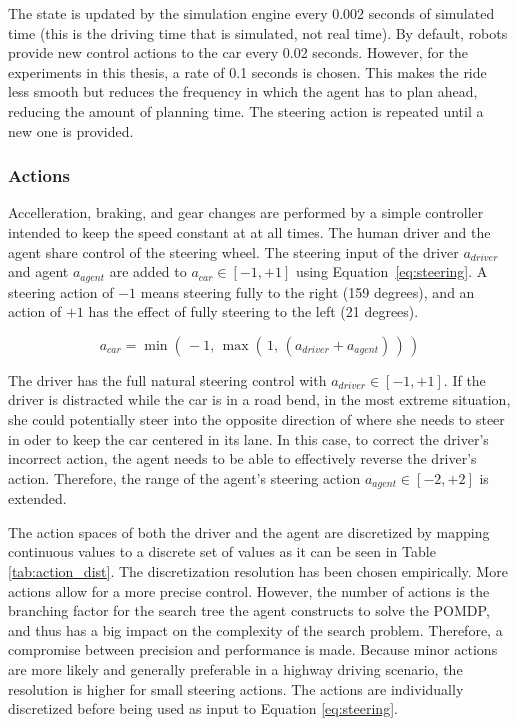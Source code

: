 The state is updated by the simulation engine every 0.002 seconds of simulated time (this is the driving time that is simulated, not real time). By default, robots provide new control actions to the car every 0.02 seconds. However, for the experiments in this thesis, a rate of 0.1 seconds is chosen. This makes the ride less smooth but reduces the frequency in which the agent has to plan ahead, reducing the amount of planning time. The steering action is repeated until a new one is provided.

\subsubsection{Actions}
\label{sec:actions}

Accelleration, braking, and gear changes are performed by a simple controller intended to keep the speed constant at at all times. The human driver and the agent share control of the steering wheel. The steering input of the driver $a_{driver}$ and agent $a_{agent}$ are added to $a_{car} \in [-1, +1]$ using Equation~\ref{eq:steering}. A steering action of $-1$ means steering fully to the right (159 degrees), and an action of $+1$ has the effect of fully steering to the left (21 degrees). 

\begin{equation}
    a_{car} = \min(\, -1, \, \max(\, 1, \, (a_{driver} + a_{agent})\,)\,)
    \label{eq:steering}
\end{equation}

The driver has the  full natural steering control with $a_{driver} \in [-1, +1]$. If the driver is distracted while the car is in a road bend, in the most extreme situation, she could potentially steer into the opposite direction of where she needs to steer in oder to keep the car centered in its lane. In this case, to correct the driver's incorrect action, the agent needs to be able to effectively reverse the driver's action. Therefore, the range of the agent's steering action $a_{agent} \in [-2, +2]$ is extended. 

The action spaces of both the driver and the agent are discretized by mapping continuous values to a discrete set of values as it can be seen in Table \ref{tab:action_dist}. The discretization resolution has been chosen empirically. More actions allow for a more precise control. However, the number of actions is the branching factor for the search tree the agent constructs to solve the POMDP, and thus has a big impact on the complexity of the search problem. Therefore, a compromise between precision and performance is made. Because minor actions are more likely and generally preferable in a highway driving scenario, the resolution is higher for small steering actions. The actions are individually discretized before being used as input to Equation \ref{eq:steering}.

